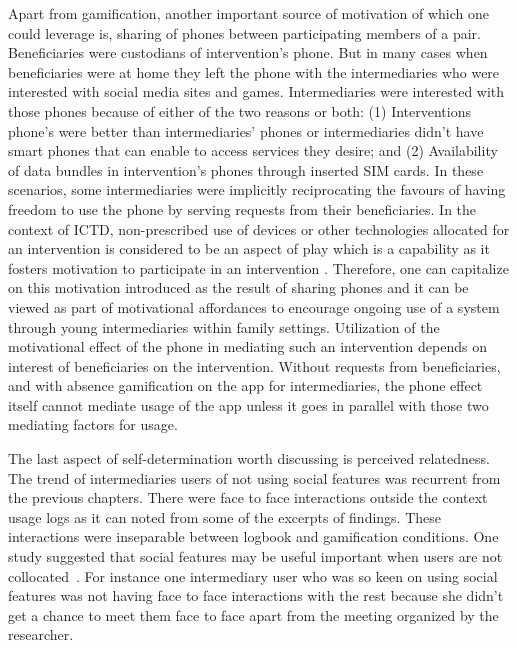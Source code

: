 Apart from gamification, another important source of motivation of which one could leverage is, sharing of phones between participating members of a pair. Beneficiaries were custodians of intervention's phone. But in many cases when beneficiaries were at home they left the phone with the intermediaries who were interested with social media sites and  games. Intermediaries were interested with those phones because of either of the two reasons or both: (1) Interventions phone's were better than intermediaries' phones or intermediaries didn't have smart phones that can enable to access services they desire; and (2) Availability of data bundles in intervention's phones through inserted SIM cards. In these scenarios, some intermediaries were implicitly reciprocating the favours of having freedom to use the phone by serving requests from their beneficiaries. In the context of ICTD, non-prescribed use of devices or other technologies allocated for an intervention is considered to be an aspect of play which is a capability as it fosters motivation to participate in an intervention \citep{ferrplay2015}. Therefore, one can capitalize on this motivation introduced as the result of sharing phones and it can be viewed as part of motivational affordances to encourage ongoing use of a system through young intermediaries within family settings. Utilization of the motivational effect of the phone in mediating such an intervention depends on interest of beneficiaries on the intervention. Without requests from beneficiaries, and with absence gamification on the app for intermediaries, the phone effect itself cannot mediate usage of the app unless it goes in parallel with those two mediating factors for usage.

The last aspect of self-determination worth discussing is perceived relatedness. The trend of intermediaries users of not using social features was recurrent from the previous chapters. There were face to face interactions outside the context usage logs as it can noted from some of the excerpts of findings. These interactions were inseparable between logbook and gamification conditions. One study suggested that social features may be useful important when users are not collocated~\citep{lin2006:fish}. For instance one intermediary user who was so keen on using social features was not having face to face interactions with the rest because she didn't get a chance to meet them face to face apart from the meeting organized by the researcher. 
